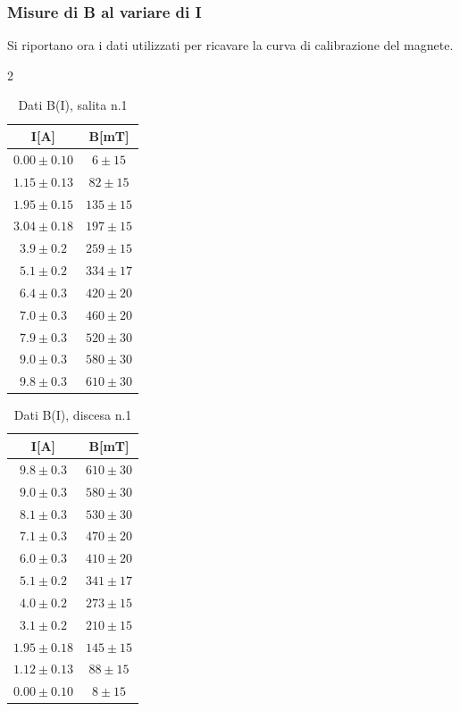 \subsubsection{Misure di B al variare di I}
\label{sec:B_I}
Si riportano ora i dati utilizzati per ricavare la curva di calibrazione del magnete.
\begin{multicols}{2}
\begin{table}[H]
	\centering
    \begin{tabular}{|c|c|}
    \hline
    \textbf{I[A]} & \textbf{B[mT]} \\ \hline\hline
    $0.00\pm0.10$ &	$6  \pm15	$\\ \hline
    $1.15\pm0.13 $&	$82 \pm15 $		\\ \hline
    $1.95\pm0.15 $&	$135\pm15$	\\ \hline
    $3.04\pm0.18 $&	$197\pm15$	\\ \hline
    $3.9\pm0.2 	 $&	$259\pm15$	\\ \hline
    $5.1\pm0.2 	 $&	$334\pm17$	\\ \hline
    $6.4\pm0.3 	 $&	$420\pm20$	\\ \hline
    $7.0\pm0.3 	 $& 	$460\pm20$	\\ \hline
    $7.9\pm0.3   $&	$520\pm30$	\\ \hline
    $9.0\pm0.3   $&	$580\pm30$	\\ \hline
    $9.8\pm0.3   $&	$610\pm30$	\\ \hline
\end{tabular}
\caption{Dati B(I), salita n.1}
\end{table}
\begin{table}[H]
	\centering
    \begin{tabular}{|c|c|} \hline
\textbf{I[A]} & \textbf{B[mT]}	\\ \hline\hline
$9.8\pm0.3  $&	$610\pm	30$	\\ \hline
$9.0\pm0.3  $&	$580\pm	30$	\\ \hline
$8.1\pm0.3  $& $530\pm	30$	\\ \hline
$7.1\pm0.3  $& $470\pm	20$	\\ \hline
$6.0\pm0.3  $& $410\pm	20$	\\ \hline
$5.1\pm0.2  $& $341\pm	17$	\\ \hline
$4.0\pm0.2  $& $273\pm	15$	\\ \hline
$3.1\pm0.2  $& $210\pm	15$	\\ \hline
$1.95\pm0.18 $& $145\pm	15$	\\ \hline
$1.12\pm0.13$&	$88 \pm 15$	\\ \hline
$0.00\pm0.10  $& $8  \pm 15$	\\ \hline
\end{tabular}
\caption{Dati B(I), discesa n.1}
\end{table}
\end{multicols}
